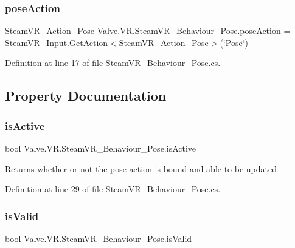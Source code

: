 \subsubsection{\texorpdfstring{poseAction}{poseAction}}
{\footnotesize\ttfamily \mbox{\hyperlink{class_valve_1_1_v_r_1_1_steam_v_r___action___pose}{Steam\+V\+R\+\_\+\+Action\+\_\+\+Pose}} Valve.\+V\+R.\+Steam\+V\+R\+\_\+\+Behaviour\+\_\+\+Pose.\+pose\+Action = Steam\+V\+R\+\_\+\+Input.\+Get\+Action$<$\mbox{\hyperlink{class_valve_1_1_v_r_1_1_steam_v_r___action___pose}{Steam\+V\+R\+\_\+\+Action\+\_\+\+Pose}}$>$(\char`\"{}Pose\char`\"{})}



Definition at line 17 of file Steam\+V\+R\+\_\+\+Behaviour\+\_\+\+Pose.\+cs.



\subsection{Property Documentation}
\mbox{\label{class_valve_1_1_v_r_1_1_steam_v_r___behaviour___pose_a76fabf036c82c1731feaaa24244bc653}} 
\subsubsection{\texorpdfstring{isActive}{isActive}}
{\footnotesize\ttfamily bool Valve.\+V\+R.\+Steam\+V\+R\+\_\+\+Behaviour\+\_\+\+Pose.\+is\+Active\hspace{0.3cm}{\ttfamily [get]}}



Returns whether or not the pose action is bound and able to be updated 



Definition at line 29 of file Steam\+V\+R\+\_\+\+Behaviour\+\_\+\+Pose.\+cs.

\mbox{\label{class_valve_1_1_v_r_1_1_steam_v_r___behaviour___pose_a703ee83cb05c779ce0098824374a4fb1}} 
\subsubsection{\texorpdfstring{isValid}{isValid}}
{\footnotesize\ttfamily bool Valve.\+V\+R.\+Steam\+V\+R\+\_\+\+Behaviour\+\_\+\+Pose.\+is\+Valid\hspace{0.3cm}{\ttfamily [get]}}



